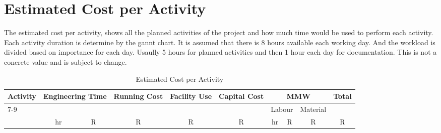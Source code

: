 
\chapter{Estimated Cost per Activity}

The estimated cost per activity, shows all the planned activities of the project and how much time would be used to perform each activity. Each activity duration is determine by the gannt chart. It is assumed that there is 8 hours available each working day. And the workload is divided based on importance for each day. Usaully 5 hours for planned activities and then 1 hour each day for documentation. This is not a concrete value and is subject to change.
\begin{landscape} 

\begin{table}[H]
    \centering
    \footnotesize                   
    \setlength{\tabcolsep}{4pt} 
    \caption{Estimated Cost per Activity}    
    \begin{tabular}{|l|c|c|c|c|c|c|c|c|c|}
        \hline

            \multirow{3}{*}{Activity} & 
            \multicolumn{2}{c|}{\multirow{2}{*}{Engineering Time}} & 
            \multirow{2}{*}{Running Cost} & 
            \multirow{2}{*}{Facility Use} & 
            \multirow{2}{*}{Capital Cost} & 
            \multicolumn{3}{c|}{MMW} & 
            \multirow{3}{*}{Total} \\
        \cline{7-9}
            & 
            \multicolumn{2}{c|}{} &     
            &                           
            &                           
            &                           
            \multicolumn{2}{c|}{Labour} & 
            Material & 
            \\
        \hline
            & hr & R & R & R & R & hr & R & R & R \\
        \hline



\end{tabular}
\end{table}
\end{landscape}
